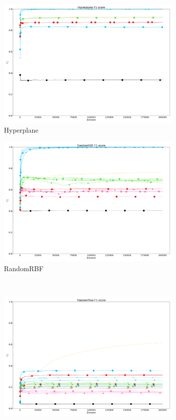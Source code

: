 \begin{figure}
\begin{subfigure}[t]{.49\linewidth}
		\includegraphics[width=\linewidth]{figures/results/dataset_1_f1.png}
		\caption{Hyperplane}
		\label{fig:f1-dataset_1}
	\end{subfigure}
	\hfill
	\begin{subfigure}[t]{.49\linewidth}
		\includegraphics[width=\linewidth]{figures/results/dataset_2_f1.png}
		\caption{RandomRBF}
		\label{fig:f1-dataset_2}
	\end{subfigure}\\
	\begin{subfigure}[t]{.49\linewidth}
		\includegraphics[width=\linewidth]{figures/results/dataset_3_f1.png}

\end{subfigure}
\end{figure}
